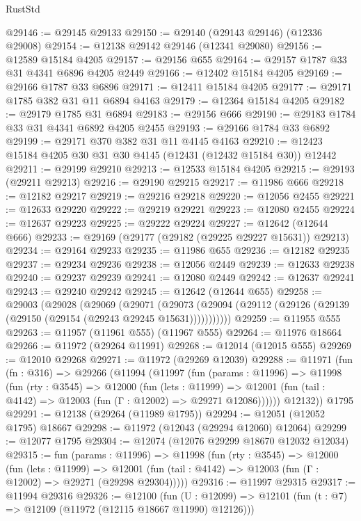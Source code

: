 \begin{lexlean}{RustStd}
\begin{coremodule}
@29146 := @29145 @29133
@29150 := @29140 (@29143 @29146) (@12336 @29008)
@29154 := @12138 @29142 @29146 (@12341 @29080)
@29156 := @12589 @15184 @4205
@29157 := @29156 @655
@29164 := @29157 @1787 @33 @31 @4341 @6896 @4205 @2449
@29166 := @12402 @15184 @4205
@29169 := @29166 @1787 @33 @6896
@29171 := @12411 @15184 @4205
@29177 := @29171 @1785 @382 @31 @11 @6894 @4163
@29179 := @12364 @15184 @4205
@29182 := @29179 @1785 @31 @6894
@29183 := @29156 @666
@29190 := @29183 @1784 @33 @31 @4341 @6892 @4205 @2455
@29193 := @29166 @1784 @33 @6892
@29199 := @29171 @370 @382 @31 @11 @4145 @4163
@29210 := @12423 @15184 @4205 @30 @31 @30 @4145 (@12431 (@12432 @15184 @30)) @12442
@29211 := @29199 @29210
@29213 := @12533 @15184 @4205
@29215 := @29193 (@29211 @29213)
@29216 := @29190 @29215
@29217 := @11986 @666
@29218 := @12182 @29217
@29219 := @29216 @29218
@29220 := @12056 @2455
@29221 := @12633 @29220
@29222 := @29219 @29221
@29223 := @12080 @2455
@29224 := @12637 @29223
@29225 := @29222 @29224
@29227 := @12642 (@12644 @666)
@29233 := @29169 (@29177 (@29182 (@29225 @29227 @15631)) @29213)
@29234 := @29164 @29233
@29235 := @11986 @655
@29236 := @12182 @29235
@29237 := @29234 @29236
@29238 := @12056 @2449
@29239 := @12633 @29238
@29240 := @29237 @29239
@29241 := @12080 @2449
@29242 := @12637 @29241
@29243 := @29240 @29242
@29245 := @12642 (@12644 @655)
@29258 := @29003
    (@29028
      (@29069
        (@29071
          (@29073 (@29094 (@29112 (@29126 (@29139 (@29150 (@29154 (@29243 @29245 @15631)))))))))))
@29259 := @11955 @555
@29263 := @11957 (@11961 @555) (@11967 @555)
@29264 := @11976 @18664
@29266 := @11972 (@29264 @11991)
@29268 := @12014 (@12015 @555)
@29269 := @12010 @29268
@29271 := @11972 (@29269 @12039)
@29288 := @11971
    (fun (fn : @316) =>
    @29266
      (@11994
        (@11997
          (fun (params : @11996) =>
          @11998
            (fun (rty : @3545) =>
            @12000
              (fun (lets : @11999) =>
              @12001 (fun (tail : @4142) => @12003 (fun (Γ : @12002) => @29271 @12086))))))
        @12132))
    @1795
@29291 := @12138 (@29264 (@11989 @1795))
@29294 := @12051 (@12052 @1795) @18667
@29298 := @11972 (@12043 (@29294 @12060) @12064)
@29299 := @12077 @1795
@29304 := @12074 (@12076 @29299 @18670 @12032 @12034)
@29315 := fun (params : @11996) =>
  @11998
    (fun (rty : @3545) =>
    @12000
      (fun (lets : @11999) =>
      @12001 (fun (tail : @4142) => @12003 (fun (Γ : @12002) => @29271 (@29298 @29304)))))
@29316 := @11997 @29315
@29317 := @11994 @29316
@29326 := @12100
    (fun (U : @12099) => @12101 (fun (t : @7) => @12109 (@11972 (@12115 @18667 @11990) @12126)))

\end{coremodule}
\end{lexlean}
